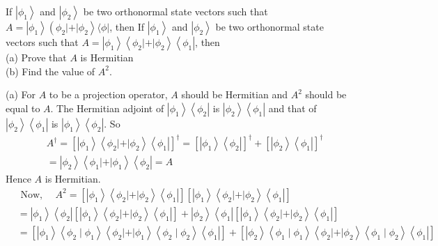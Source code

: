 \begin{enumerate}
	\begin{minipage}{\textwidth}
	\item If $\left|\phi_{1}\right\rangle$ and $\left|\phi_{2}\right\rangle$ be two orthonormal state vectors such that $A=\left|\phi_{1}\right\rangle\left(\phi_{2}|+| \phi_{2}\right\rangle\langle\phi|$, then If $\left|\phi_{1}\right\rangle$ and $\left|\phi_{2}\right\rangle$ be two orthonormal state vectors such that $A=\left|\phi_{1}\right\rangle\left\langle\phi_{2}|+| \phi_{2}\right\rangle\left\langle\phi_{1}\right|$, then\\
	(a) Prove that $A$ is Hermitian\\
	(b) Find the value of $A^{2}$.
\end{minipage}
\begin{answer}
(a) For $A$ to be a projection operator, $A$ should be Hermitian and $A^{2}$ should be equal to $A$. The Hermitian adjoint of $\left|\phi_{1}\right\rangle\left\langle\phi_{2}\right|$ is $\left|\phi_{2}\right\rangle\left\langle\phi_{1}\right|$ and that of $\left|\phi_{2}\right\rangle\left\langle\phi_{1}\right|$ is $\left|\phi_{1}\right\rangle\left\langle\phi_{2}\right|$. So
	\begin{align*}
	&A^{\dagger}=\left[\left|\phi_{1}\right\rangle\left\langle\phi_{2}|+| \phi_{2}\right\rangle\left\langle\phi_{1}\right|\right]^{\dagger}=\left[\left|\phi_{1}\right\rangle\left\langle\phi_{2}\right|\right]^{\dagger}+\left[\left|\phi_{2}\right\rangle\left\langle\phi_{1}\right|\right]^{\dagger} \\
	&=\left|\phi_{2}\right\rangle\left\langle\phi_{1}|+| \phi_{1}\right\rangle\left\langle\phi_{2}\right|=A
	\end{align*}
	Hence $A$ is Hermitian.\\
\begin{align*}
	&\text { Now, } \quad A^{2}=\left[\left|\phi_{1}\right\rangle\left\langle\phi_{2}|+| \phi_{2}\right\rangle\left\langle\phi_{1}\right|\right]\left[\left|\phi_{1}\right\rangle\left\langle\phi_{2}|+| \phi_{2}\right\rangle\left\langle\phi_{1}\right|\right] \\
	&=\left|\phi_{1}\right\rangle\left\langle\phi_{2}\left|\left[\left|\phi_{1}\right\rangle\left\langle\phi_{2}|+| \phi_{2}\right\rangle\left\langle\phi_{1}\right|\right]+\right| \phi_{2}\right\rangle\left\langle\phi_{1}\right|\left[\left|\phi_{1}\right\rangle\left\langle\phi_{2}|+| \phi_{2}\right\rangle\left\langle\phi_{1}\right|\right] \\
	&=\left[\left|\phi_{1}\right\rangle\left\langle\phi_{2} \mid \phi_{1}\right\rangle\left\langle\phi_{2}|+| \phi_{1}\right\rangle\left\langle\phi_{2} \mid \phi_{2}\right\rangle\left\langle\phi_{1}\right|\right]+\left[\left|\phi_{2}\right\rangle\left\langle\phi_{1} \mid \phi_{1}\right\rangle\left\langle\phi_{2}|+| \phi_{2}\right\rangle\left\langle\phi_{1} \mid \phi_{2}\right\rangle\left\langle\phi_{1}\right|\right] \\

\end{align*}
\end{answer}
\end{enumerate}
